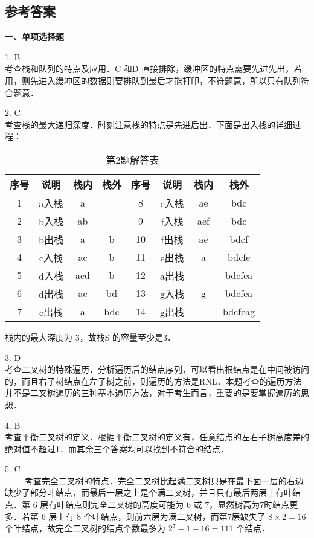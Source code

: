 \subsection{参考答案}
\textbf{一、单项选择题}

1. B \\
考查栈和队列的特点及应用．C 和D 直接排除，缓冲区的特点需要先进先出，若用，则先进入缓冲区的数据则要排队到最后才能打印，不符题意，所以只有队列符合题意．

2. C \\
考查栈的最大递归深度．时刻注意栈的特点是先进后出．下面是出入栈的详细过程：
\begin{table}[ht]
\centering
\caption{第2题解答表}\label{CSN09_tab5}
\begin{tabular}{|c|c|c|c|c|c|c|c|}
\hline
序号 & 说明 & 栈内 & 栈外 & 序号 & 说明 & 栈内 & 栈外 \\
\hline
1 & a入栈 & a & & 8 & e入栈 & ae & bdc \\
\hline
2 & b入栈 & ab & & 9 & f入栈 & aef & bdc \\
\hline
3 & b出栈 & a & b & 10 & f出栈 & ae & bdcf \\
\hline
4 & c入栈 & ac & b & 11 & e出栈 & a & bdcfe \\
\hline
5 & d入栈 & acd & b & 12 & a出栈 & & bdcfea \\
\hline
6 & d出栈 & ac & bd & 13 & g入栈 & g & bdcfea \\
\hline
7 & c出栈 & a & bdc & 14 & g出栈 & & bdcfeag \\
\hline
\end{tabular}
\end{table}
栈内的最大深度为 3，故栈S 的容量至少是3．

3. D \\
考查二叉树的特殊遍历．分析遍历后的结点序列，可以看出根结点是在中间被访问的，而且右子树结点在左子树之前，则遍历的方法是RNL．本题考查的遍历方法并不是二叉树遍历的三种基本遍历方法，对于考生而言，重要的是要掌握遍历的思想．

4. B \\
考查平衡二叉树的定义．根据平衡二叉树的定义有，任意结点的左右子树高度差的绝对值不超过1．而其余三个答案均可以找到不符合的结点．

5. C \\
$\qquad$ 考查完全二叉树的特点．完全二叉树比起满二叉树只是在最下面一层的右边缺少了部分叶结点，而最后一层之上是个满二叉树，并且只有最后两层上有叶结点．第 $6$ 层有叶结点则完全二叉树的高度可能为 $6$ 或 $7$，显然树高为7时结点更多．若第 $6$ 层上有 $8$ 个叶结点，则前六层为满二叉树，而第7层缺失了 $8\times2=16$ 个叶结点，故完全二叉树的结点个数最多为 $2^7-1-16=111$ 个结点．

